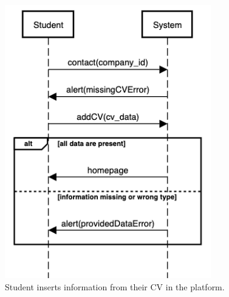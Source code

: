     \begin{figure}[H]
        \centering
        \includegraphics[width=0.8\textwidth]{RASD/Assets/SequenceDiagrams/2-student-provide-his-cv.png}
        \caption{Student inserts information from their CV in the platform.}
        \label{fig:Student provides his CV’s information to the platform}
    \end{figure}


